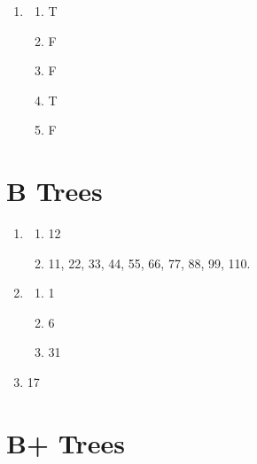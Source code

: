 \documentclass{article}
\begin{document}
\begin{enumerate}
    \item \begin{enumerate}
        \item T
        \item F
        \item F
        \item T
        \item F
    \end{enumerate}
\end{enumerate}

\newpage

\section{B Trees}

\begin{enumerate}
    \item \begin{enumerate}
        \item 12
        \item 11, 22, 33, 44, 55, 66, 77, 88, 99, 110.
    \end{enumerate}

    \item \begin{enumerate}
        \item 1
        \item 6
        \item 31
    \end{enumerate}

    \item 17
\end{enumerate}

\newpage

\section{B+ Trees}
\end{document}
